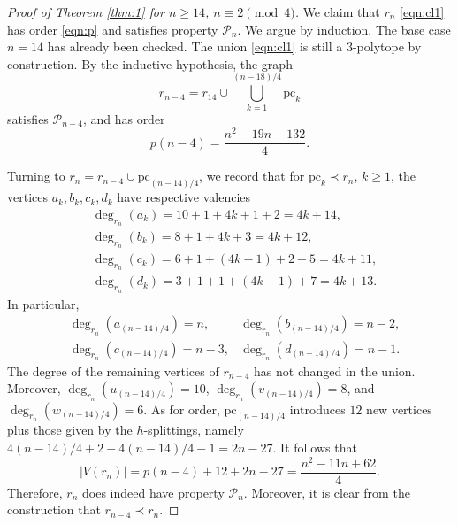 \documentclass[11pt]{article}
\theoremstyle{definition}
\numberwithin{equation}{section}
\def\calP{\mathcal{P}}
\begin{document}
\begin{proof}[Proof of Theorem \ref{thm:1} for $n\geq 14$, $n\equiv 2 \pmod 4$]
We claim that $r_n$ \eqref{eqn:cl1} has order \eqref{eqn:p} and satisfies property $\calP_n$. We argue by induction. The base case $n=14$ has already been checked. The union \eqref{eqn:cl1} is still a $3$-polytope by construction. By the inductive hypothesis, the graph
\begin{equation*}
r_{n-4}=r_{14}\cup\bigcup_{k=1}^{(n-18)/4}\text{pc}_{k}
\end{equation*}
satisfies $\calP_{n-4}$, and has order
\[p(n-4)=\frac{n^2-19n+132}{4}.\]

Turning to $r_n=r_{n-4}\cup\text{pc}_{(n-14)/4}$, we record that for $\text{pc}_k\prec r_n$, $k\geq 1$, the vertices $a_k,b_k,c_k,d_k$ have respective valencies
\begin{align*}
&\deg_{r_n}(a_k)=10+1+4k+1+2=4k+14,  \\&\deg_{r_n}(b_k)=8+1+4k+3=4k+12,  \\&\deg_{r_n}(c_k)=6+1+(4k-1)+2+5=4k+11,  \\&\deg_{r_n}(d_k)=3+1+1+(4k-1)+7=4k+13.
\end{align*}
In particular,
\begin{align*}
&\deg_{r_n}(a_{(n-14)/4})=n,   &\deg_{r_n}(b_{(n-14)/4})=n-2,  \\ &\deg_{r_n}(c_{(n-14)/4})=n-3,   &\deg_{r_n}(d_{(n-14)/4})=n-1.
\end{align*}
The degree of the remaining vertices of $r_{n-4}$ has not changed in the union. Moreover, $\deg_{r_n}(u_{(n-14)/4})=10$, $\deg_{r_n}(v_{(n-14)/4})=8$, and $\deg_{r_n}(w_{(n-14)/4})=6$. As for order, $\text{pc}_{(n-14)/4}$ introduces $12$ new vertices plus those given by the $h$-splittings, namely $4(n-14)/4+2+4(n-14)/4-1=2n-27$. It follows that
\[|V(r_n)|=p(n-4)+12+2n-27=\frac{n^2-11n+62}{4}.\]
Therefore, $r_n$ does indeed have property $\calP_n$. Moreover, it is clear from the construction that $r_{n-4}\prec r_n$.
\end{proof}
\end{document}
